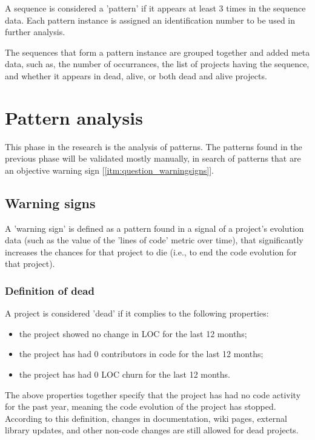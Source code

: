A sequence is considered a 'pattern' if it appears at least 3 times in the
sequence data. Each pattern instance is assigned an identification number to be
used in further analysis.

The sequences that form a pattern instance are grouped together and added meta
data, such as, the number of occurrances, the list of projects having the
sequence, and whether it appears in dead, alive, or both dead and alive
projects.



\section{Pattern analysis}
This phase in the research is the analysis of patterns. The patterns found
in the previous phase will be validated mostly manually, in search of patterns
that are an objective warning sign [\ref{itm:question_warningsigns}].

\subsection{Warning signs}
A 'warning sign' is defined as a pattern found in a signal of a project's
evolution data (such as the value of the 'lines of code' metric over time), that
significantly increases the chances for that project to die (i.e., to end the
code evolution for that project).

\subsubsection{Definition of dead}
\label{def:dead}
A project is considered 'dead' if it complies to the following properties:
\begin{itemize}
	\item the project showed no change in LOC for the last 12 months;
	\item the project has had 0 contributors in code for the last 12 months;
	\item the project has had 0 LOC churn for the last 12 months.
\end{itemize}

\noindent
The above properties together specify that the project has had no code activity
for the past year, meaning the code evolution of the project has stopped.
According to this definition, changes in documentation, wiki pages, external
library updates, and other non-code changes are still allowed for dead projects.

